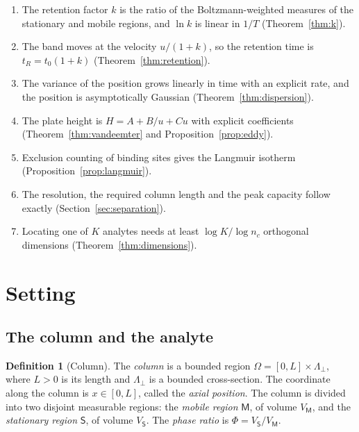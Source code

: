 \documentclass[11pt,a4paper]{article}
\theoremstyle{definition}
\newtheorem{definition}[theorem]{Definition}
\theoremstyle{remark}
\newcommand{\Mob}{\mathsf{M}}
\newcommand{\Sta}{\mathsf{S}}
\begin{document}
\begin{enumerate}[label=(\roman*),leftmargin=2.2em]
\item The retention factor $k$ is the ratio of the Boltzmann-weighted measures of the stationary and mobile regions, and $\ln k$ is linear in $1/T$ (Theorem~\ref{thm:k}).
\item The band moves at the velocity $u/(1+k)$, so the retention time is $t_R=t_0(1+k)$ (Theorem~\ref{thm:retention}).
\item The variance of the position grows linearly in time with an explicit rate, and the position is asymptotically Gaussian (Theorem~\ref{thm:dispersion}).
\item The plate height is $H=A+B/u+Cu$ with explicit coefficients (Theorem~\ref{thm:vandeemter} and Proposition~\ref{prop:eddy}).
\item Exclusion counting of binding sites gives the Langmuir isotherm (Proposition~\ref{prop:langmuir}).
\item The resolution, the required column length and the peak capacity follow exactly (Section~\ref{sec:separation}).
\item Locating one of $K$ analytes needs at least $\log K/\log n_c$ orthogonal dimensions (Theorem~\ref{thm:dimensions}).
\end{enumerate}

\section{Setting}
\label{sec:setting}

\subsection{The column and the analyte}

\begin{definition}[Column]
\label{def:column}
The \emph{column} is a bounded region $\Omega=[0,L]\times\Lambda_\perp$, where $L>0$ is its length and $\Lambda_\perp$ is a bounded cross-section.
The coordinate along the column is $x\in[0,L]$, called the \emph{axial position}.
The column is divided into two disjoint measurable regions: the \emph{mobile region} $\Mob$, of volume $V_\Mob$, and the \emph{stationary region} $\Sta$, of volume $V_\Sta$.
The \emph{phase ratio} is $\Phi=V_\Sta/V_\Mob$.
\end{definition}
\end{document}
